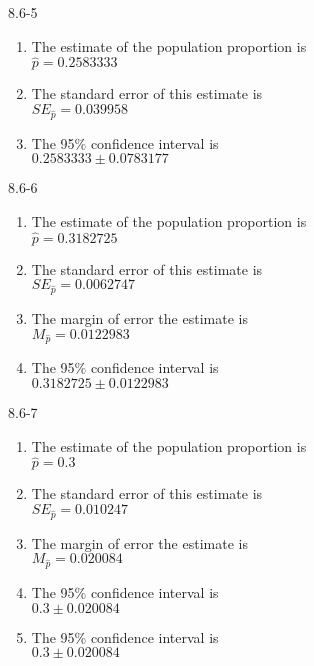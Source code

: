 \begin{exsol@solution}{8.6-5}

\begin{enumerate}
\item	The estimate of the population proportion is \\ $\hat{p} = 0.2583333$
\item	The standard error of this estimate is \\ $SE_{\hat{p}} = 0.039958$
\item	The 95\% confidence interval is \\ $0.2583333 \pm 0.0783177$
\end{enumerate}
\end{exsol@solution}
\begin{exsol@solution}{8.6-6}

\begin{enumerate}
\item	The estimate of the population proportion is \\ $\hat{p} = 0.3182725$
\item	The standard error of this estimate is \\ $SE_{\hat{p}} = 0.0062747$
\item The margin of error the estimate is \\ $M_{\hat{p}} = 0.0122983$
\item	The 95\% confidence interval is \\ $0.3182725 \pm 0.0122983$
\end{enumerate}
\end{exsol@solution}
\begin{exsol@solution}{8.6-7}

\begin{enumerate}
\item	The estimate of the population proportion is \\ $\hat{p} = 0.3$
\item	The standard error of this estimate is \\ $SE_{\hat{p}} = 0.010247$
\item The margin of error the estimate is \\ $M_{\hat{p}} = 0.020084$
\item	The 95\% confidence interval is \\ $0.3 \pm 0.020084$
\item	The 95\% confidence interval is \\ $0.3 \pm 0.020084$
\end{enumerate}
\end{exsol@solution}
